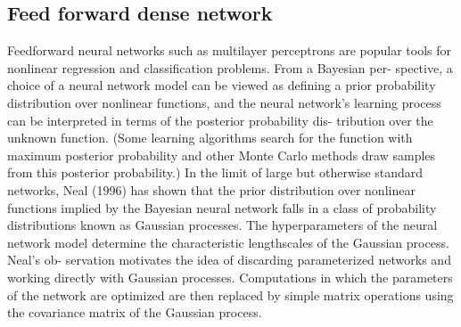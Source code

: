 
\subsection{Feed forward dense network}
%

Feedforward neural networks such as multilayer perceptrons are popular tools
for nonlinear regression and classification problems. From a Bayesian per-
spective, a choice of a neural network model can be viewed as defining a prior
probability distribution over nonlinear functions, and the neural network’s
learning process can be interpreted in terms of the posterior probability dis-
tribution over the unknown function. (Some learning algorithms search for the
function with maximum posterior probability and other Monte Carlo methods
draw samples from this posterior probability.)
In the limit of large but otherwise standard networks, Neal (1996) has
shown that the prior distribution over nonlinear functions implied by the
Bayesian neural network falls in a class of probability distributions known
as Gaussian processes. The hyperparameters of the neural network model
determine the characteristic lengthscales of the Gaussian process. Neal’s ob-
servation motivates the idea of discarding parameterized networks and working
directly with Gaussian processes. Computations in which the parameters of
the network are optimized are then replaced by simple matrix operations using
the covariance matrix of the Gaussian process.

